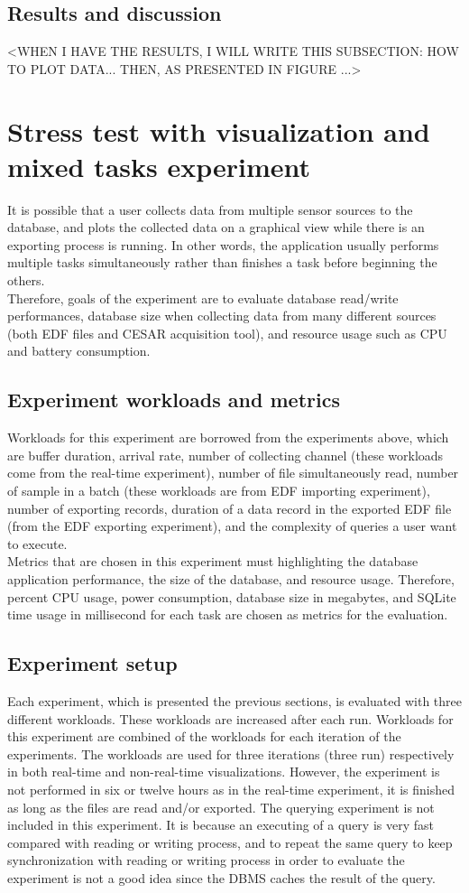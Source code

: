 \subsection{Results and discussion}
<WHEN I HAVE THE RESULTS, I WILL WRITE THIS SUBSECTION: HOW TO PLOT DATA... THEN, AS PRESENTED IN FIGURE ...>
\section{Stress test with visualization and mixed tasks experiment}
It is possible that a user collects data from multiple sensor sources to the database, and plots the collected data on a graphical view while there is an exporting process is running. In other words, the application usually performs multiple tasks simultaneously rather than finishes a task before beginning the others.\\
Therefore, goals of the experiment are to evaluate database read/write performances, database size when collecting data from many different sources (both EDF files and CESAR acquisition tool), and resource usage such as CPU and battery consumption.
\subsection{Experiment workloads and metrics}
Workloads for this experiment are borrowed from the experiments above, which are buffer duration, arrival rate, number of collecting channel (these workloads come from the real-time experiment), number of file simultaneously read, number of sample in a batch (these workloads are from EDF importing experiment), number of exporting records, duration of a data record in the exported EDF file (from the EDF exporting experiment), and the complexity of queries a user want to execute.\\
Metrics that are chosen in this experiment must highlighting the database application performance, the size of the database, and resource usage. Therefore, percent CPU usage, power consumption, database size in megabytes, and SQLite time usage in millisecond for each task are chosen as metrics for the evaluation.
\subsection{Experiment setup}
Each experiment, which is presented the previous sections, is evaluated with three different workloads. These workloads are increased after each run. Workloads for this experiment are combined of the workloads for each iteration of the experiments. The workloads are used for three iterations (three run) respectively in both real-time and non-real-time visualizations. However, the experiment is not performed in six or twelve hours as in the real-time experiment, it is finished as long as the files are read and/or exported. The querying experiment is not included in this experiment. It is because an executing of a query is very fast compared with reading or writing process, and to repeat the same query to keep synchronization with reading or writing process in order to evaluate the experiment is not a good idea since the DBMS caches the result of the query.
